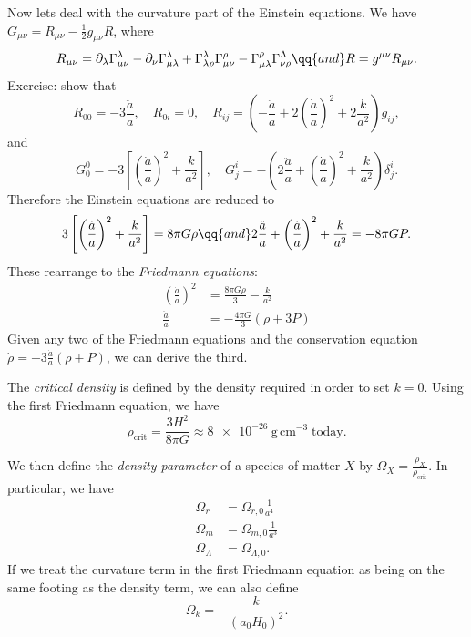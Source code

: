 \documentclass{jknotes}
\begin{document}
Now lets deal with the curvature part of the Einstein equations. We have \(G_{\mu\nu} = R_{\mu\nu} - \frac{1}{2}g_{\mu\nu}R\), where
\begin{equation}
    R_{\mu\nu}=\partial_\lambda\Gamma^\lambda_{\mu\nu} - \partial_\nu\Gamma^\lambda_{\mu\lambda} + \Gamma^\lambda_{\lambda\rho}\Gamma^\rho_{\mu\nu} - \Gamma^\rho_{\mu\lambda}\Gamma^\Lambda_{\nu\rho} \qq{and} R = g^{\mu\nu}R_{\mu\nu}.
\end{equation}
Exercise: show that
\begin{equation}
    R_{00} = -3\frac{\ddot{a}}{a},\quad R_{0i}=0,\quad R_{ij} = \left(-\frac{\ddot{a}}{a} + 2\left(\frac{\dot{a}}{a}\right)^2 + 2\frac{k}{a^2}\right)g_{ij},
\end{equation}
and
\begin{equation}
    G_0^0 = -3\left[\left(\frac{\dot{a}}{a}\right)^2 + \frac{k}{a^2}\right],\quad G^i_j = -\left(2\frac{\ddot{a}}{a} + \left(\frac{\dot{a}}{a}\right)^2 + \frac{k}{a^2}\right)\delta_j^i.
\end{equation}
Therefore the Einstein equations are reduced to
\begin{equation}
    3\left[\left(\frac{\dot{a}}{a}\right)^2+\frac{k}{a^2}\right] = 8\pi G\rho \qq{and} 2\frac{\ddot{a}}{a} + \left(\frac{\dot{a}}{a}\right)^2 + \frac{k}{a^2} = -8\pi GP.
\end{equation}
These rearrange to the \emph{Friedmann equations}:
\begin{align}
    \left(\frac{\dot{a}}{a}\right)^2 &= \frac{8\pi G\rho}{3} - \frac{k}{a^2} \\
    \frac{\ddot{a}}{a} &= -\frac{4\pi G}{3}(\rho + 3P)
\end{align}
Given any two of the Friedmann equations and the conservation equation \(\dot{\rho} = -3\frac{\dot{a}}{a}(\rho+P)\), we can derive the third.

The \emph{critical density} is defined by the density required in order to set \(k=0\). Using the first Friedmann equation, we have
\begin{equation}
    \rho_{\text{crit}} = \frac{3H^2}{8\pi G} \approx \SI{8e-26}{\gram\,\centi\metre^{-3}}\;\text{today}.
\end{equation}

We then define the \emph{density parameter} of a species of matter \(X\) by \(\Omega_X = \frac{\rho_X}{\rho_{\text{crit}}}\). In particular, we have
\begin{align}
    \Omega_r &= \Omega_{r,0} \frac{1}{a^4} \\
    \Omega_m &= \Omega_{m,0} \frac{1}{a^3} \\
    \Omega_\Lambda &= \Omega_{\Lambda,0}.
\end{align}
If we treat the curvature term in the first Friedmann equation as being on the same footing as the density term, we can also define 
\begin{equation}
    \Omega_k = -\frac{k}{(a_0H_0)^2}.
\end{equation}
\end{document}
